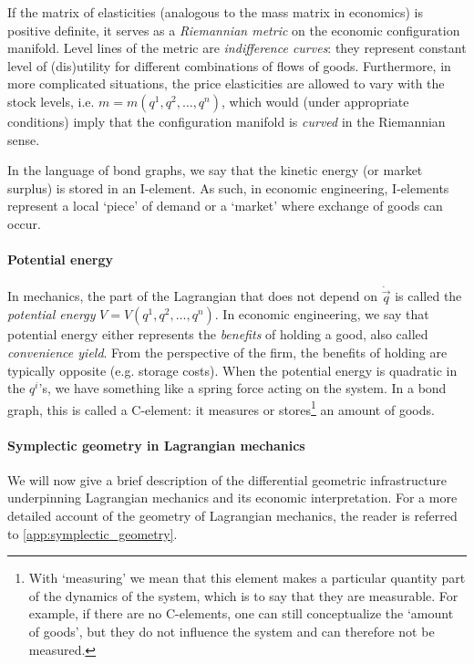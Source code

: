 If the matrix of elasticities (analogous to the mass matrix in economics) is positive definite, it serves as a \emph{Riemannian metric} on the economic configuration manifold. Level lines of the metric are \emph{indifference curves}: they represent constant level of (dis)utility for different combinations of flows of goods. Furthermore, in more complicated situations, the price elasticities are allowed to vary with the stock levels, i.e. $ m = m(q^1, q^2, \ldots, q^n)$, which would (under appropriate conditions) imply that the  configuration manifold is \emph{curved} in the Riemannian sense.

In the language of bond graphs, we say that the kinetic energy (or market surplus) is stored in an I-element. As such, in economic engineering, I-elements represent a local `piece' of demand or a `market' where exchange of goods can occur.

\paragraph{Potential energy} In mechanics, the part of the Lagrangian that does not depend on $\dot{\vec{q}}$ is called the \emph{potential energy} $V = V(q^1, q^2, \ldots, q^n)$. In economic engineering, we say that potential energy either represents the \emph{benefits} of holding a good, also called \emph{convenience yield}. From the perspective of the firm, the benefits of holding are typically opposite (e.g. storage costs). When the potential energy is quadratic in the $q^i$'s, we have something like a spring force acting on the system. In a bond graph, this is called a C-element: it measures or stores\footnote{With `measuring' we mean that this element makes a particular quantity part of the dynamics of the system, which is to say that they are measurable. For example, if there are no C-elements, one can still conceptualize the `amount of goods', but they do not influence the system and can therefore not be measured.} an amount of goods.

\paragraph{Symplectic geometry in Lagrangian mechanics} 
We will now give a brief description of the differential geometric infrastructure underpinning Lagrangian mechanics and its economic interpretation. For a more detailed account of the geometry of Lagrangian mechanics, the reader is referred to \cref{app:symplectic_geometry}.

